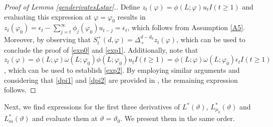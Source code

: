 {{\begin{proof}[Proof of Lemma \ref{genderivatesLstar}.]


Define $z_t(\varphi) = \phi(L;\varphi) { u_t I (t \geq 1) }$ and evaluating this expression at $\varphi = \varphi_0$ results in $z_t(\varphi_0) = \epsilon_t - \sum_{j = t}^{\infty} \phi_j(\varphi_0) u_{t-j} = \epsilon_t$, which follows from Assumption \ref{A5}. Moreover, by observing that $S^+_t(d, \varphi) = \Delta_+^{d-d_0} z_t(\varphi)$, which can be used to conclude the proof of \eqref{exp0} and \eqref{exp1}. Additionally, note that $z_t(\varphi) = \phi(L;\varphi) \omega(L;\varphi_0) \phi(L;\varphi_0) { u_t I (t \geq 1) } = \phi(L;\varphi) \omega(L;\varphi_0){\epsilon_t I(t \geq 1)}$, which can be used to establish \eqref{exp2}. By employing similar arguments and considering that \eqref{dpi1} and \eqref{dpi2} are provided in \textcite[Lemma A.4]{johansen2016role}, the remaining expression follows.
\end{proof}

Next, we find expressions for the first three derivatives of $L^*(\vartheta)$, $L^*_{\mu_0}(\vartheta)$ and $L^*_{m}(\vartheta)$ and evaluate them at $\vartheta = \vartheta_0$. We present them in the same order. 

}}
